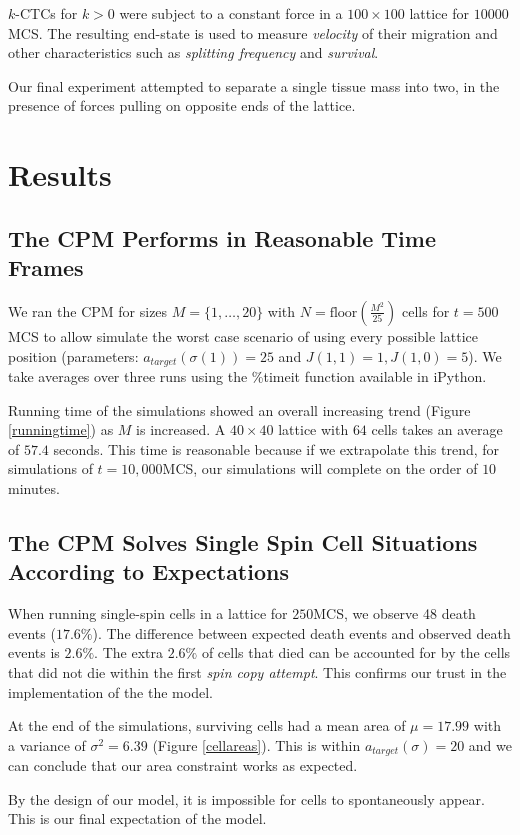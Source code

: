 \documentclass[12pt]{article}
\begin{document}
$k$-CTCs for $k>0$ were subject to a constant force in a $100\times100$ lattice for $10000$MCS. The resulting end-state is used to measure \emph{velocity} of their migration and other characteristics such as \emph{splitting frequency} and \emph{survival}.

Our final experiment attempted to separate a single tissue mass into two, in the presence of forces pulling on opposite ends of the lattice.

\section{Results}
\subsection{The CPM Performs in Reasonable Time Frames}
We ran the CPM for sizes $M=\{1, \ldots , 20\}$ with $N=\text{floor}(\frac{M^2}{25})$ cells for $t=500$MCS to allow simulate the worst case scenario of using every possible lattice position (parameters: $a_{target}(\sigma(1))=25$ and $J(1,1)=1, J(1,0)=5$). We take averages over three runs using the \%timeit function available in iPython.

Running time of the simulations showed an overall increasing trend (Figure \ref{runningtime}) as $M$ is increased. A $40\times40$ lattice with $64$ cells takes an average of $57.4$ seconds. This time is reasonable because if we extrapolate this trend, for simulations of $t=10,000$MCS, our simulations will complete on the order of $10$ minutes.

\subsection{The CPM Solves Single Spin Cell Situations According to Expectations}
When running single-spin cells in a lattice for $250$MCS, we observe 48 death events ($17.6\%$). The difference between expected death events and observed death events is $2.6\%$. The extra $2.6\%$ of cells that died can be accounted for by the cells that did not die within the first \emph{spin copy attempt}. This confirms our trust in the implementation of the the model.

At the end of the simulations, surviving cells had a mean area of $\mu = 17.99$ with a variance of $\sigma^2 = 6.39$ (Figure \ref{cellareas}). This is within $a_{target}(\sigma)=20$ and we can conclude that our area constraint works as expected. 

By the design of our model, it is impossible for cells to spontaneously appear. This is our final expectation of the model.
\end{document}
